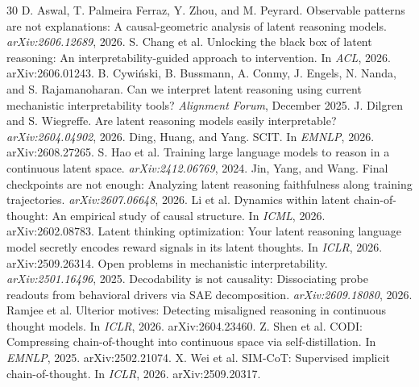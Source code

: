 \documentclass{article}
\begin{document}
\begin{thebibliography}{30}
\small
{} D. Aswal, T. Palmeira Ferraz, Y. Zhou, and M. Peyrard. Observable patterns are not explanations: A causal-geometric analysis of latent reasoning models. \emph{arXiv:2606.12689}, 2026.
 S. Chang et al. Unlocking the black box of latent reasoning: An interpretability-guided approach to intervention. In \emph{ACL}, 2026. arXiv:2606.01243.
 B. Cywi\'nski, B. Bussmann, A. Conmy, J. Engels, N. Nanda, and S. Rajamanoharan. Can we interpret latent reasoning using current mechanistic interpretability tools? \emph{Alignment Forum}, December 2025.
 J. Dilgren and S. Wiegreffe. Are latent reasoning models easily interpretable? \emph{arXiv:2604.04902}, 2026.
 Ding, Huang, and Yang. SCIT. In \emph{EMNLP}, 2026. arXiv:2608.27265.
 S. Hao et al. Training large language models to reason in a continuous latent space. \emph{arXiv:2412.06769}, 2024.
 Jin, Yang, and Wang. Final checkpoints are not enough: Analyzing latent reasoning faithfulness along training trajectories. \emph{arXiv:2607.06648}, 2026.
 Li et al. Dynamics within latent chain-of-thought: An empirical study of causal structure. In \emph{ICML}, 2026. arXiv:2602.08783.
 Latent thinking optimization: Your latent reasoning language model secretly encodes reward signals in its latent thoughts. In \emph{ICLR}, 2026. arXiv:2509.26314.
 Open problems in mechanistic interpretability. \emph{arXiv:2501.16496}, 2025.
 Decodability is not causality: Dissociating probe readouts from behavioral drivers via SAE decomposition. \emph{arXiv:2609.18080}, 2026.
 Ramjee et al. Ulterior motives: Detecting misaligned reasoning in continuous thought models. In \emph{ICLR}, 2026. arXiv:2604.23460.
 Z. Shen et al. CODI: Compressing chain-of-thought into continuous space via self-distillation. In \emph{EMNLP}, 2025. arXiv:2502.21074.
 X. Wei et al. SIM-CoT: Supervised implicit chain-of-thought. In \emph{ICLR}, 2026. arXiv:2509.20317.
\end{thebibliography}
\end{document}
